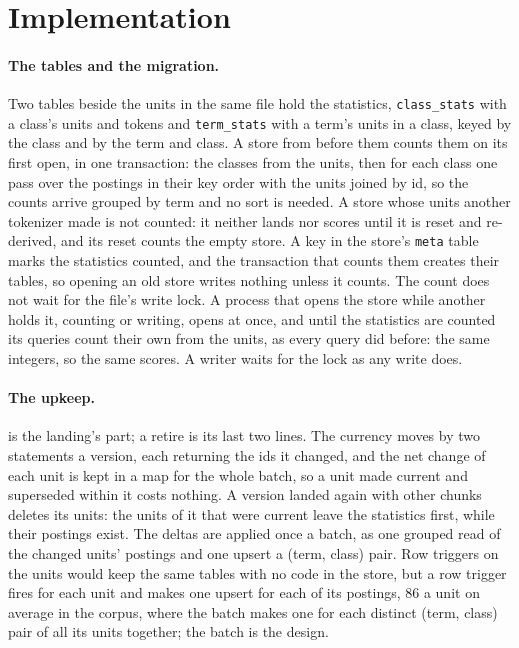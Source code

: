 \documentclass[11pt]{article}
\theoremstyle{plain}
\theoremstyle{definition}
\theoremstyle{remark}
\newcommand{\code}[1]{\texttt{#1}}
\begin{document}
\section{Implementation}\label{sec:impl}

\paragraph{The tables and the migration.} Two tables beside the units in the same file hold
the statistics, \code{class\_stats} with a class's units and tokens and \code{term\_stats} with a
term's units in a class, keyed by the class and by the term and class. A store from before them counts them on its first open, in one transaction: the
classes from the units, then for each class one pass over the postings in their key order with
the units joined by id, so the counts arrive grouped by term and no sort is needed. A store whose
units another tokenizer made is not counted: it neither lands nor scores until it is reset and
re-derived, and its reset counts the empty store. A key in the store's \code{meta} table marks the
statistics counted, and the transaction that counts them creates their tables, so opening an old
store writes nothing unless it counts. The count does not wait for the file's write lock. A process
that opens the store while another holds it, counting or writing, opens at once, and until the
statistics are counted its queries count their own from the units, as every query did before:
the same integers, so the same scores. A writer waits for the lock as any write does.

\paragraph{The upkeep.}  is the landing's part; a retire is its last two lines.
The currency moves by two statements a version, each returning the ids it changed, and the net
change of each unit is kept in a map for the whole batch, so a unit made current and superseded
within it costs nothing. A version landed again with other chunks deletes its units: the units of
it that were current leave the statistics first, while their postings exist. The deltas are
applied once a batch, as one grouped read of the changed units' postings and one upsert a
(term, class) pair. Row triggers on the units would keep the same tables with no code in the
store, but a row trigger fires for each unit and makes one upsert for each of its postings,
86 a unit on average in the corpus, where the batch makes one for each distinct (term, class)
pair of all its units together; the batch is the design.
\end{document}

